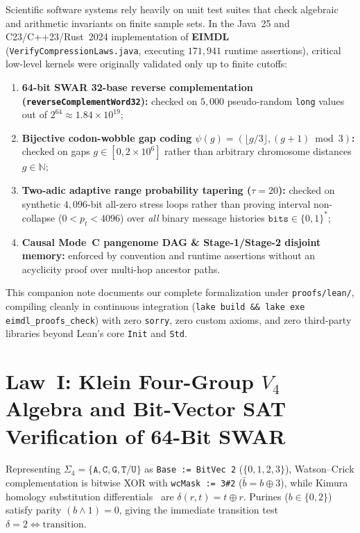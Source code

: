 \documentclass[10pt]{article}
\begin{document}
Scientific software systems rely heavily on unit test suites that check algebraic and arithmetic invariants on finite sample sets. In the Java~25 and C23/C++23/Rust~2024 implementation of \textbf{EIMDL}~\cite{rissanen1978modeling} (\texttt{VerifyCompressionLaws.java}, executing $171,941$ runtime assertions), critical low-level kernels were originally validated only up to finite cutoffs:
\begin{enumerate}
  \item \textbf{64-bit SWAR 32-base reverse complementation (\texttt{reverseComplementWord32}):} checked on $5,000$ pseudo-random \texttt{long} values out of $2^{64} \approx 1.84 \times 10^{19}$;
  \item \textbf{Bijective codon-wobble gap coding $\psi(g) = (\lfloor g/3 \rfloor, (g+1)\bmod 3)$:} checked on gaps $g \in [0, 2 \times 10^6]$ rather than arbitrary chromosome distances $g \in \mathbb{N}$;
  \item \textbf{Two-adic adaptive range probability tapering ($\tau = 20$):} checked on synthetic $4,096$-bit all-zero stress loops rather than proving interval non-collapse ($0 < p_t < 4096$) over \emph{all} binary message histories $\texttt{bits} \in \{0,1\}^*$;
  \item \textbf{Causal Mode~C pangenome DAG \& Stage-1/Stage-2 disjoint memory:} enforced by convention and runtime assertions without an acyclicity proof over multi-hop ancestor paths.
\end{enumerate}

This companion note documents our complete formalization under \texttt{proofs/lean/}, compiling cleanly in continuous integration (\texttt{lake build \&\& lake exe eimdl\_proofs\_check}) with zero \texttt{sorry}, zero custom axioms, and zero third-party libraries beyond Lean's core \texttt{Init} and \texttt{Std}.

\section{Law~I: Klein Four-Group $V_4$ Algebra and Bit-Vector SAT Verification of 64-Bit SWAR}

Representing $\Sigma_4 = \{\texttt{A}, \texttt{C}, \texttt{G}, \texttt{T/U}\}$ as \texttt{Base := BitVec 2} ($\{0, 1, 2, 3\}$), Watson--Crick complementation is bitwise XOR with \texttt{wcMask := 3\#2} ($\bar{b} = b \oplus 3$), while Kimura homology substitution differentials~\cite{kimura1980simple} are $\delta(r, t) = t \oplus r$. Purines ($b \in \{0, 2\}$) satisfy parity $(b \land 1) = 0$, giving the immediate transition test $\delta = 2 \iff \text{transition}$.
\end{document}
